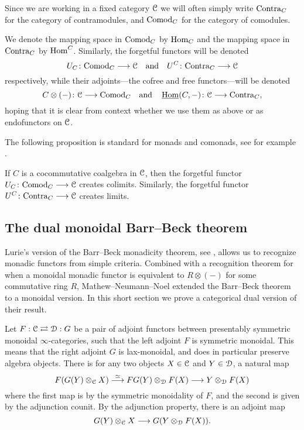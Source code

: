 \begin{notation}
    Since we are working in a fixed category $\EuScript{C}$ we will often simply write $\mathrm{Contra}_C$ for the category of contramodules, and $\mathrm{Comod}_C$ for the category of comodules. 
\end{notation}

\begin{notation}
    We denote the mapping space in $\mathrm{Comod}_C$ by $\operatorname{Hom}_C$ and the mapping space in $\mathrm{Contra}_C$ by $\operatorname{Hom}^C$. Similarly, the forgetful functors will be denoted 
    \[U_C\colon\mathrm{Comod}_C\longrightarrow \EuScript{C} \quad\text{and}\quad  U^C\colon \mathrm{Contra}_C\longrightarrow \EuScript{C}\] 
    respectively, while their adjoints---the cofree and free functors---will be denoted 
    \[C\otimes (-)\colon\EuScript{C}\longrightarrow \mathrm{Comod}_C \quad \text{and}\quad \operatorname{\underline{Hom}}(C, -)\colon \EuScript{C}\longrightarrow \mathrm{Contra}_C,\] 
    hoping that it is clear from context whether we use them as above or as endofunctors on $\EuScript{C}$.
\end{notation}

The following proposition is standard for monads and comonads, see for example \cite[5.7]{riehl-verity_2015}. 

\begin{proposition}
    \label{ch2:prop:creates-colimits-and-limits}
    If $C$ is a cocommutative coalgebra in $\EuScript{C}$, then the forgetful functor $U_C\colon\mathrm{Comod}_C\longrightarrow \EuScript{C}$ creates colimits. Similarly, the forgetful functor $U^C\colon\mathrm{Contra}_C\longrightarrow \EuScript{C}$ creates limits. 
\end{proposition}







\subsection{The dual monoidal Barr--Beck theorem}
\label{ch2:ssec:dual-barr-beck}

Lurie's version of the Barr--Beck monadicity theorem, see \cite[Section 4.7]{Lurie_HA}, allows us to recognize monadic functors from simple criteria. Combined with a recognition theorem for when a monoidal monadic functor is equivalent to $R\otimes(-)$ for some commutative ring $R$, Mathew--Neumann--Noel extended the Barr--Beck theorem to a monoidal version. In this short section we prove a categorical dual version of their result. 

Let $F:\EuScript{C}\rightleftarrows \EuScript{D}:G$ be a pair of adjoint functors between presentably symmetric monoidal $\infty$-categories, such that the left adjoint $F$ is symmetric monoidal. This means that the right adjoint $G$ is lax-monoidal, and does in particular preserve algebra objects. There is for any two objects $X\in \EuScript{C}$ and $Y\in \EuScript{D}$, a natural map
\[F(G(Y)\otimes_{\EuScript{C}} X)\overset{\simeq}{\longrightarrow} FG(Y)\otimes_{\EuScript{D}} F(X) \longrightarrow Y\otimes_{\EuScript{D}} F(X)\]
where the first map is by the symmetric monoidality of $F$, and the second is given by the adjunction counit. By the adjunction property, there is an adjoint map 
\[G(Y)\otimes_{\EuScript{C}} X \longrightarrow G(Y\otimes_{\EuScript{D}} F(X)).\]

